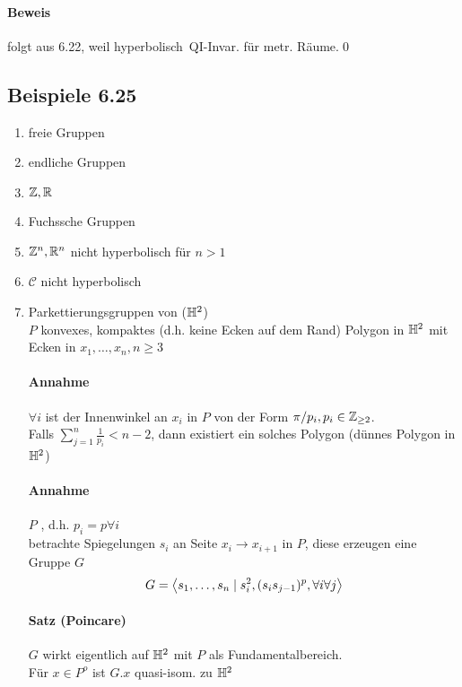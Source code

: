 \documentclass{article}
\renewcommand{\C}{\mathcal{C}}
\begin{document}
\paragraph{Beweis} folgt aus 6.22, weil \grqq hyperbolisch\glqq\ QI-Invar. für metr. Räume.\qed

\subsection{Beispiele 6.25}
\begin{enumerate}
	\item freie Gruppen
	\item endliche Gruppen
	\item $\mathbb{Z}, \mathbb{R}$
	\item Fuchssche Gruppen
	\item $\mathbb{Z}^n, \mathbb{R}^n$ nicht hyperbolisch für $n > 1$
	\item $\C$ nicht hyperbolisch
	
	\item Parkettierungsgruppen von ($\mathbb{H}^2$)\\
	$P$ konvexes, kompaktes (d.h. keine Ecken auf dem Rand) Polygon in $\mathbb{H}^2$ mit Ecken in $x_1, \ldots, x_n, n\geq 3$\\
	\paragraph{Annahme} $\forall i$ ist der Innenwinkel an $x_i$ in $P$ von der Form $\pi/p_i, p_i \in \mathbb{Z}_{\geq 2}$.\\
	Falls $\sum_{j=1}^n \frac{1}{p_i} < n - 2$, dann existiert ein solches Polygon (dünnes Polygon in $\mathbb{H}^2$)\\
	\paragraph{Annahme} $P$ , d.h. $p_i = p \forall i$\\
	betrachte Spiegelungen $s_i$ an Seite $x_i \rightarrow x_{i+1}$ in $P$, diese erzeugen eine Gruppe $G$\\
	\[G = \grp{s_1, \ldots, s_n}{s_i^2, (s_is_{j-1})^{p}, \forall i \forall j }\]
	
	\paragraph{Satz (Poincare)}
	$G$ wirkt eigentlich  auf $\mathbb{H}^2$ mit $P$ als Fundamentalbereich.\\
	Für $x \in P^o$ ist $G.x$ quasi-isom. zu $\mathbb{H}^2$
\end{enumerate}
\end{document}
